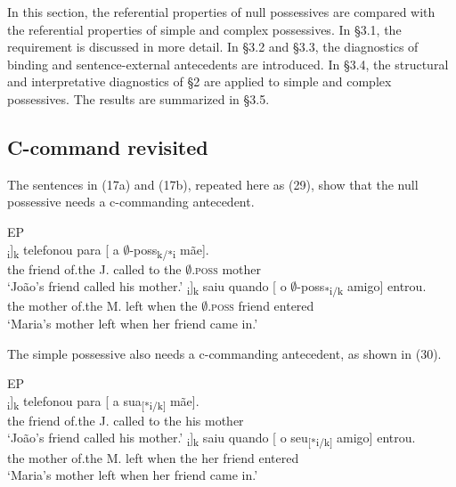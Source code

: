 \documentclass[output=paper]{langsci/langscibook}
\begin{document}
In this section, the referential properties of null possessives are compared with the referential properties of simple and complex possessives. In §3.1, the  requirement is discussed in more detail. In §3.2 and §3.3, the diagnostics of  binding and sentence-external antecedents are introduced. In §3.4, the structural and interpretative diagnostics of §2 are applied to simple and complex possessives. The results are summarized in §3.5.

\subsection{C-command revisited}%

The sentences in (17a) and (17b), repeated here as (29), show that the null possessive needs a c-commanding antecedent.

\ea%
    EP\label{ex:wein:29}\\
    \ea
    \gll \relax[ O amigo d[o João]\textsubscript{i}]\textsubscript{k} telefonou para [ a $\emptyset$-poss\textsubscript{k/*i} mãe].\\
         {} the friend of.the J. called   to {} the $\emptyset$\textsc{.poss} mother\\
    \glt ‘João’s friend called his mother.’
    \ex  
    \gll \relax [ A mãe d[a Maria]\textsubscript{i}]\textsubscript{k} saiu quando [ o $\emptyset$-poss\textsubscript{*i/k} amigo] entrou.\\
         {} the mother of.the M. left when {} the $\emptyset$\textsc{.poss} friend entered\\
    \glt ‘Maria’s mother left when her friend came in.’
    \z
\z    


The simple possessive also needs a c-commanding antecedent, as shown in (30).

\ea%
    EP\label{ex:wein:30}\\
    \ea
    \gll \relax[ O amigo d[o João]\textsubscript{i}]\textsubscript{k} telefonou para [ a   sua\textsubscript{[*i/k]} mãe].\\
         {} the friend of.the J. called   to {} the his mother\\
    \glt ‘João’s friend called his mother.’
    \ex  
    \gll \relax[ A mãe d[a Maria]\textsubscript{i}]\textsubscript{k} saiu quando [ o seu\textsubscript{[*i/k]} amigo] entrou.\\
        {} the mother of.the M. left when {} the her friend entered\\
    \glt ‘Maria’s mother left when her friend came in.’
    \z
\z
\end{document}
